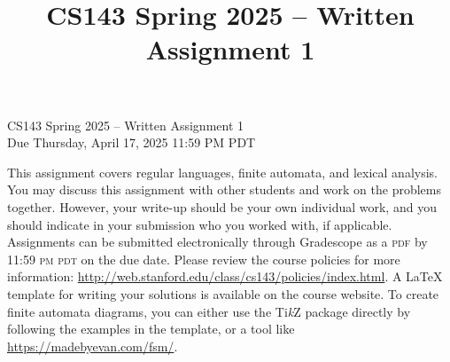 \documentclass[11pt]{article}
\title{CS143 Spring 2025 -- Written Assignment 1}
\newcommand{\tikzname}{Ti\emph{k}Z}
\begin{document}
\begin{center}
{\LARGE{CS143 Spring 2025 -- Written Assignment 1}} \\
{\large Due Thursday, April 17, 2025 11:59 PM PDT}
\end{center}

This assignment covers regular languages, finite automata, and lexical analysis. You may discuss this assignment with other students and work on the problems together. However, your write-up should be your own individual work, and you should indicate in your submission who you worked with, if applicable. Assignments can be submitted electronically through Gradescope as a \textsc{pdf} by 11:59 \textsc{pm pdt} on the due date. Please review the course policies for more information: \url{http://web.stanford.edu/class/cs143/policies/index.html}. A \LaTeX{} template for writing your solutions is available on the course website. To create finite automata diagrams, you can either use the \tikzname{} package directly by following the examples in the template, or a tool like \url{https://madebyevan.com/fsm/}.
\end{document}
